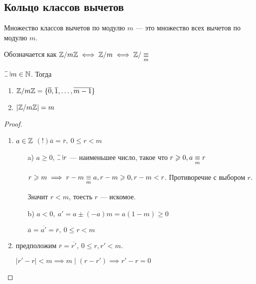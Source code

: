 \subsection{Кольцо классов вычетов}

\begin{defn}
    Множество классов вычетов по модулю $m$ --- это множество всех вычетов по модулю $m$.

    Обозначается как $\mathbb{Z}/m\mathbb{Z} \iff \mathbb{Z}/m \iff \mathbb{Z}/\underset{m}{\equiv}$
\end{defn}

\begin{theorem}

    $\letus m \in \N$. Тогда 
    
    \begin{enumerate}
        \item $\mathbb{Z}/m\mathbb{Z} = \{\overline{0}, \overline{1}, \ldots, \overline{m-1}\}$
        \item $|\mathbb{Z}/m\mathbb{Z}| = m$ 
    \end{enumerate}
\end{theorem}

\begin{proof}~

    \begin{enumerate}
        \item $a \in \mathbb{Z}$ $(!) \overline{a} = \overline{r},~0 \leq r < m$
        \begin{enumerate}
            \item[a)] $a \geq 0$, $\letus r$ --- наименьшее число, такое что $r \geqslant 0, a \underset{m}{\equiv} r$
            
            $r \geqslant m \implies r - m \underset{m}{\equiv} a, r - m \geqslant 0, r - m < r$. Противоречие с выбором $r$.
            
            Значит $r < m$, тоесть $r$ --- искомое.
            
            \item[b)] $a < 0,~a' = a \pm (-a)m = a(1-m) \geq 0$
            
            $\overline{a} = \overline{a'} = \overline{r},~0 \leq r < m$
        \end{enumerate}
        
        \item предположим $\overline{r} = \overline{r'},~0 \leq r, r' < m$.
        
        $|r' - r| < m \implies m \mid (r - r') \implies r' - r = 0$
    \end{enumerate}
\end{proof}

